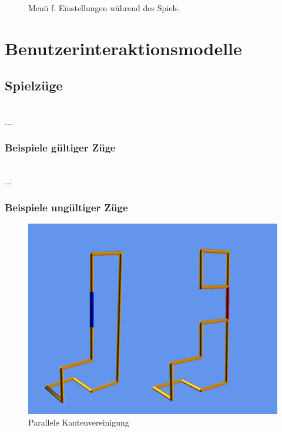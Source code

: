 	\begin{figure}[!ht]
		  \centering
		  
		  \caption{Menü f. Einstellungen während des Spiels.}
	\end{figure}
	
\clearpage


\section{Benutzerinteraktionsmodelle}

	\begin{figure}[ht]
		  \centering
		  
	\end{figure}
	
\clearpage

\subsection{Spielzüge}

~\\
...

\subsubsection{Beispiele gültiger Züge}

~\\
...

\subsubsection{Beispiele ungültiger Züge}

	\begin{figure}[htb]
	  \centering
	  \includegraphics[width = \textwidth]{Systemmodelle/Ungueltiger_Zug.png}
	  \caption{Parallele Kantenvereinigung}
	  \label{fig:zug1}
	\end{figure}

